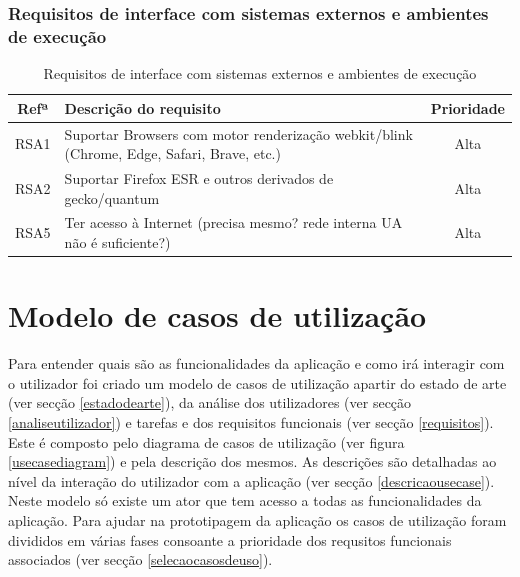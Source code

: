 \documentclass[11pt, twoside]{report}
\begin{document}
	
	\subsection{Requisitos de interface com sistemas externos e ambientes de execução}
	
	
	
	
	\begin{table}[H]
		\caption{Requisitos de interface com sistemas externos e ambientes de execução}
		\begin{center}
			\begin{tabularx}{\textwidth}{|c|X|c|}
				\hline
				\textbf{Refª } & \textbf{Descrição do requisito}                                                           & \textbf{Prioridade} \\
				\hline
				RSA1            & Suportar Browsers com motor renderização webkit/blink (Chrome, Edge, Safari, Brave, etc.) & Alta                \\
				\hline
				RSA2            & Suportar Firefox ESR e outros derivados de gecko/quantum                                    & Alta                \\
				\hline
				RSA5            & Ter acesso à Internet (precisa mesmo? rede interna UA não é suficiente?)                 & Alta                \\
				\hline
			\end{tabularx}
			\label{requisitosdesistemas}
		\end{center}
	\end{table}
	
	
	\chapter{Modelo de casos de utilização}
	
	
	Para entender quais são as funcionalidades da aplicação e como irá interagir com o utilizador foi criado um modelo de casos de utilização apartir do estado de arte (ver secção \ref{estadodearte}), da análise dos utilizadores (ver secção \ref{analiseutilizador}) e tarefas e dos requisitos funcionais (ver secção \ref{requisitos}). Este é composto pelo diagrama de casos de utilização (ver figura \ref{usecasediagram}) e pela descrição dos mesmos. As descrições são detalhadas ao nível da interação do utilizador com a aplicação (ver secção \ref{descricaousecase}). Neste modelo só existe um ator que tem acesso a todas as funcionalidades da aplicação. 
	Para ajudar na prototipagem da aplicação os casos de utilização foram divididos em várias fases consoante a prioridade dos requsitos funcionais associados (ver secção \ref{selecaocasosdeuso}).
	
\end{document}
